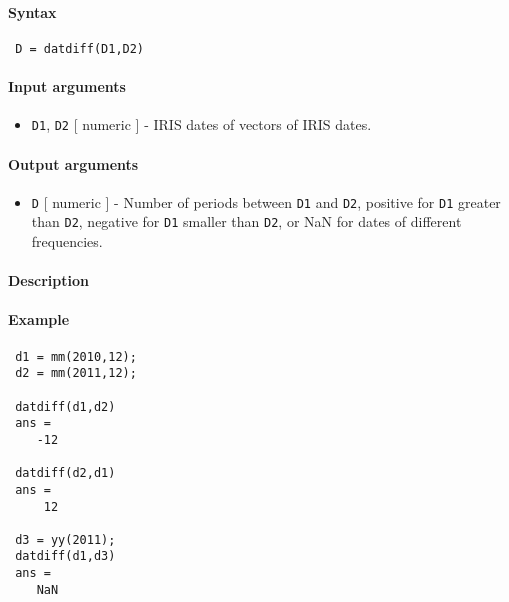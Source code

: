


	\paragraph{Syntax}
 
 \begin{verbatim}
 D = datdiff(D1,D2)
 \end{verbatim}
 
 \paragraph{Input arguments}
 
 \begin{itemize}
 \item
   \texttt{D1}, \texttt{D2} {[} numeric {]} - IRIS dates of vectors of
   IRIS dates.
 \end{itemize}
 
 \paragraph{Output arguments}
 
 \begin{itemize}
 \item
   \texttt{D} {[} numeric {]} - Number of periods between \texttt{D1} and
   \texttt{D2}, positive for \texttt{D1} greater than \texttt{D2},
   negative for \texttt{D1} smaller than \texttt{D2}, or NaN for dates of
   different frequencies.
 \end{itemize}
 
 \paragraph{Description}
 
 \paragraph{Example}
 
 \begin{verbatim}
 d1 = mm(2010,12);
 d2 = mm(2011,12);
 
 datdiff(d1,d2)
 ans =
    -12
 
 datdiff(d2,d1)
 ans =
     12
 
 d3 = yy(2011);
 datdiff(d1,d3)
 ans =
    NaN
 \end{verbatim}


